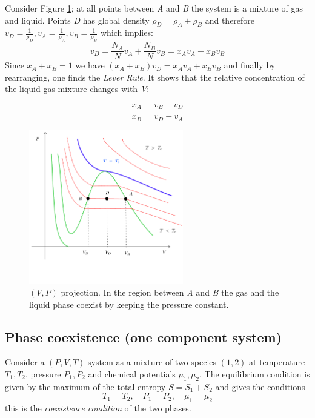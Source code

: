 \documentclass[../../Main/Main.tex]{subfiles}
\begin{document}
\begin{example}{}{}
  Consider Figure \ref{fig:3_0}; at all points between \emph{A} and \emph{B} the system is a mixture of gas and liquid. Points \emph{D} has global density \( \rho_D = \rho_A + \rho_B \)  and therefore \( v_D = \frac{1}{\rho_D}, v_A = \frac{1}{\rho _A}, v_B = \frac{1}{\rho_B} \) which implies:
  \begin{equation*}
    v_D = \frac{N_A}{N} v_A + \frac{N_B}{N} v_B = x_A v_A + x_B v_B
    \label{eq:}
  \end{equation*}
  Since \( x_A + x_B = 1 \) we have \( (x_A + x_B)v_D = x_A v_A + x_B v_B \) and finally by rearranging, one finds the \textit{Lever Rule}. It shows that the relative concentration of the liquid-gas mixture changes with \emph{V}:

  \begin{equation*}
    \frac{x_A}{x_B} = \frac{v_B - v_D}{v_D - v_A}
    \label{eq:}
  \end{equation*}
  
\end{example}

  \begin{figure}[h!]
  \centering
  \includegraphics[width=0.6\textwidth]{./img/1__2.pdf}
  \caption{\label{fig:3_0} \( (V,P) \) projection. In the region between \emph{A} and \emph{B} the gas and the liquid phase coexist by keeping the pressure constant.}
  \end{figure}


\subsection{Phase coexistence (one component system)}

Consider a \( (P,V,T) \) system as a mixture of two species \( (1,2) \) at temperature \( T_1, T_2 \), pressure \( P_1, P_2 \) and chemical potentials \( \mu _1,\mu _2 \). The equilibrium condition is given by the maximum of the total entropy \( S = S_1 + S_2 \) and gives the conditions
\begin{equation}
  T_1 = T_2, \quad P_1 = P_2, \quad \mu _1 = \mu _2
  \label{eq:}
\end{equation}
this is the \emph{coexistence condition} of the two phases.
\end{document}
